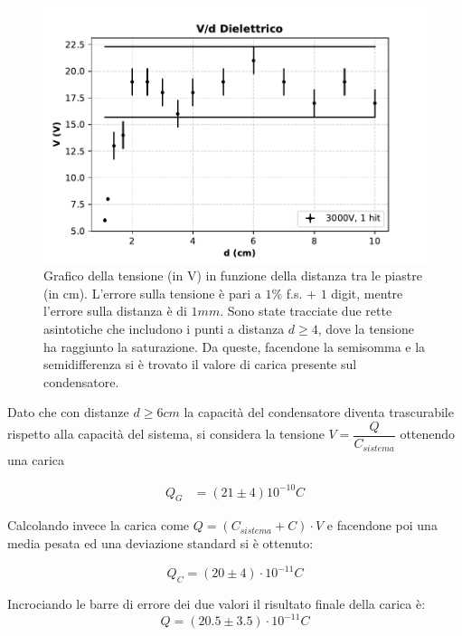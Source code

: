 {\fontsize{12}{14}\selectfont 
\begin{figure}[H]
  \centering
  \includegraphics[width=13cm]{Figures/Grafico_Parte4.pdf}
  \caption{Grafico della tensione (in V) in funzione della distanza tra le piastre (in cm). L'errore sulla tensione è pari a $1\%$ f.s. + $1$ digit, mentre l'errore sulla distanza è di $1 mm$. Sono state tracciate due rette asintotiche che includono i punti a distanza $d \geq 4$, dove la tensione ha raggiunto la saturazione. Da queste, facendone la semisomma e la semidifferenza si è trovato il valore di carica presente sul condensatore.}
  \label{fig:parteIV}
\end{figure}

Dato che con distanze $d \geq 6cm$ la capacità del condensatore diventa trascurabile rispetto alla capacità del sistema, si considera la tensione $V = \dfrac{Q}{C_{sistema}}$ ottenendo una carica

\begin{align*}
    Q_G &= (21 \pm 4) 10^{-10} C
\end{align*}

Calcolando invece la carica come $Q = (C_{sistema} + C) \cdot V$ e facendone poi una media pesata ed una deviazione standard si è ottenuto:

\begin{equation*}
    Q_C = (20 \pm 4)\cdot 10^{-11} C
\end{equation*}

Incrociando le barre di errore dei due valori il risultato finale della carica è:
\begin{equation*}
    Q = (20.5 \pm 3.5)\cdot 10^{-11} C
\end{equation*}
\par}